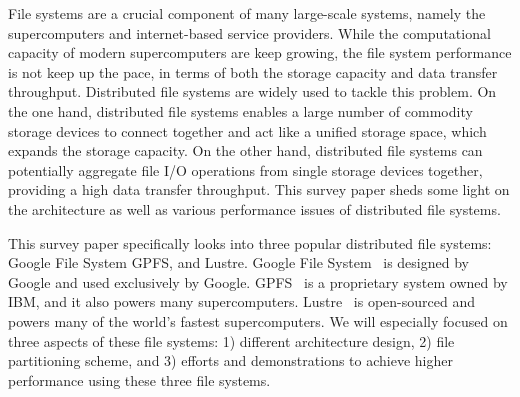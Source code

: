 File systems are a crucial component of many large-scale systems, 
namely the supercomputers and internet-based service providers.
%
While the computational capacity of modern supercomputers are keep growing,
the file system performance is not keep up the pace, in terms of both
the storage capacity and data transfer throughput.
%
Distributed file systems are widely used to tackle this problem.
%
On the one hand, distributed file systems enables a large number of commodity
storage devices to connect together and act like a unified storage space, 
which expands the storage capacity.
%
On the other hand, distributed file systems can potentially aggregate file
I/O operations from single storage devices together, providing a high
data transfer throughput. 
%
This survey paper sheds some light on the architecture as well as various
performance issues of distributed file systems.

%
This survey paper specifically looks into three popular distributed 
file systems: Google File System GPFS, and Lustre.
%
Google File System~\cite{ghemawat2003google} is designed by Google and used 
exclusively by Google.
%
GPFS~\cite{Schmuck2002,barkes1998gpfs} is a proprietary system owned by IBM, and
it also powers many supercomputers.
%
Lustre~\cite{Schwan2003} is open-sourced and powers many of the 
world's fastest supercomputers.
%
We will especially focused on three aspects of these file systems:
1) different architecture design,
2) file partitioning scheme, and 3) efforts and demonstrations to achieve
higher performance using these three file systems.
